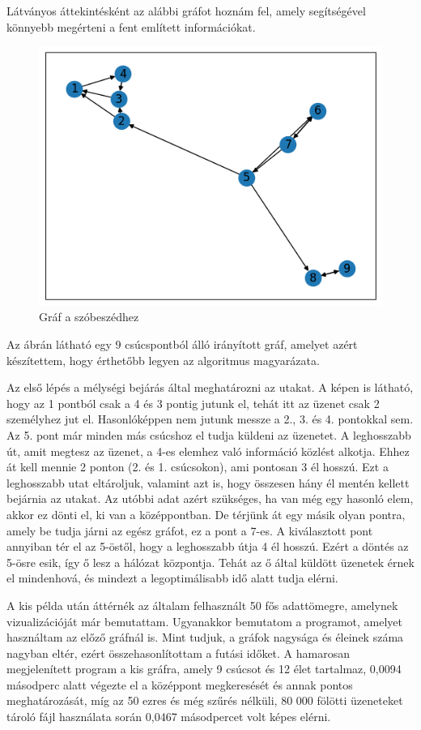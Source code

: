 Látványos áttekintésként az alábbi gráfot hoznám fel, amely segítségével könnyebb megérteni a fent említett információkat.


\begin{figure}[!h]
	\centering
	\includegraphics[scale=0.6]{images/kisgraf}
	\caption{Gráf a szóbeszédhez}
\end{figure}

Az ábrán látható egy 9 csúcspontból álló irányított gráf, amelyet azért készítettem, hogy érthetőbb legyen az algoritmus magyarázata.

Az első lépés a mélységi bejárás által meghatározni az utakat. A képen is látható, hogy az 1 pontból csak a 4 és 3 pontig jutunk el, tehát itt az üzenet csak 2 személyhez jut el. Hasonlóképpen nem jutunk messze a 2., 3. és 4. pontokkal sem. Az 5. pont már minden más csúcshoz el tudja küldeni az üzenetet. A leghosszabb út, amit megtesz az üzenet, a 4-es elemhez való információ közlést alkotja. Ehhez át kell mennie 2 ponton (2. és 1. csúcsokon), ami pontosan 3 él hosszú. Ezt a leghosszabb utat eltároljuk, valamint azt is, hogy összesen hány él mentén kellett bejárnia az utakat. Az utóbbi adat azért szükséges, ha van még egy hasonló elem, akkor ez dönti el, ki van a középpontban. De térjünk át egy másik olyan pontra, amely be tudja járni az egész gráfot, ez a pont a 7-es. A kiválasztott pont annyiban tér el az 5-östől, hogy a leghosszabb útja 4 él hosszú. Ezért a döntés az 5-ösre esik, így ő lesz a hálózat központja. Tehát az ő által küldött üzenetek érnek el mindenhová, és mindezt a legoptimálisabb idő alatt tudja elérni.

A kis példa után áttérnék az általam felhasznált 50 fős adattömegre, amelynek vizualizációját már bemutattam. Ugyanakkor bemutatom a programot, amelyet használtam az előző gráfnál is. Mint tudjuk, a gráfok nagysága és éleinek száma nagyban eltér, ezért összehasonlítottam a futási időket. A hamarosan megjelenített program a kis gráfra, amely 9 csúcsot és 12 élet tartalmaz, 0,0094 másodperc alatt végezte el a középpont megkeresését és annak pontos meghatározását, míg az 50 ezres és még szűrés nélküli, 80 000 fölötti üzeneteket tároló fájl használata során 0,0467 másodpercet volt képes elérni.


